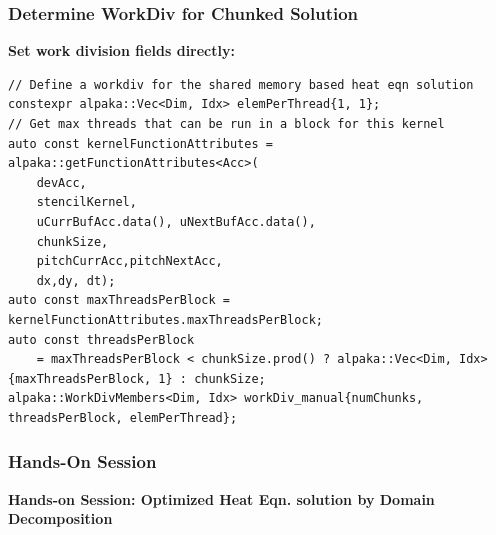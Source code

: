 \documentclass[9pt]{beamer}
\begin{document}
\begin{frame}[fragile]
\frametitle{Determine WorkDiv for Chunked Solution}

\textbf{Set work division fields directly:}
\lstset{basicstyle=\ttfamily\scriptsize}
\begin{lstlisting}
// Define a workdiv for the shared memory based heat eqn solution
constexpr alpaka::Vec<Dim, Idx> elemPerThread{1, 1};
// Get max threads that can be run in a block for this kernel
auto const kernelFunctionAttributes = alpaka::getFunctionAttributes<Acc>(
    devAcc,
    stencilKernel,
    uCurrBufAcc.data(), uNextBufAcc.data(),
    chunkSize,
    pitchCurrAcc,pitchNextAcc,
    dx,dy, dt);
auto const maxThreadsPerBlock = kernelFunctionAttributes.maxThreadsPerBlock;
auto const threadsPerBlock
    = maxThreadsPerBlock < chunkSize.prod() ? alpaka::Vec<Dim, Idx>{maxThreadsPerBlock, 1} : chunkSize;
alpaka::WorkDivMembers<Dim, Idx> workDiv_manual{numChunks, threadsPerBlock, elemPerThread};
\end{lstlisting}
\end{frame}

\begin{frame}
\frametitle{Hands-On Session}
\begin{center}
      \Huge \textbf{Hands-on Session: Optimized Heat Eqn. solution by Domain Decomposition}
  \end{center}
\end{frame}

\end{document}
